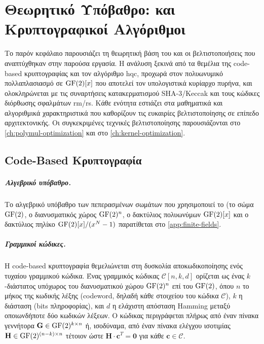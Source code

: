 \chapter{Θεωρητικό Υπόβαθρο: \HQC και Κρυπτογραφικοί Αλγόριθμοι}
\label{ch:theoretical-background}

Το παρόν κεφάλαιο παρουσιάζει τη θεωρητική βάση του \HQC και οι βελτιστοποιήσεις
που αναπτύχθηκαν στην παρούσα εργασία.
Η ανάλυση ξεκινά από τα θεμέλια της code-based κρυπτογραφίας και τον αλγόριθμο \gls{hqc},
προχωρά στον πολυωνυμικό πολλαπλασιασμό σε $\mathrm{GF}(2)[x]$ που αποτελεί τον υπολογιστικά
κυρίαρχο πυρήνα, και ολοκληρώνεται με τις συναρτήσεις κατακερματισμού SHA-3/Keccak
και τους κώδικες διόρθωσης σφαλμάτων \gls{rm}/\gls{rs}.
Κάθε ενότητα εστιάζει στα μαθηματικά και αλγοριθμικά χαρακτηριστικά που καθορίζουν
τις ευκαιρίες βελτιστοποίησης σε επίπεδο αρχιτεκτονικής. Οι συγκεκριμένες τεχνικές
βελτιστοποίησης παρουσιάζονται στο \cref{ch:polymul-optimization} και
στο \cref{ch:kernel-optimization}.


\section{Code-Based Κρυπτογραφία}
\label{sec:code-based-crypto}

\paragraph{Αλγεβρικό υπόβαθρο.}
Το αλγεβρικό υπόβαθρο των πεπερασμένων σωμάτων που χρησιμοποιεί το \HQC (το σώμα $\mathrm{GF}(2)$, ο διανυσματικός χώρος $\mathrm{GF}(2)^n$, ο δακτύλιος πολυωνύμων $\mathrm{GF}(2)[x]$ και ο δακτύλιος πηλίκο $\mathrm{GF}(2)[x]/(x^{N}-1)$ παρατίθεται στο \cref{app:finite-fields}.


\paragraph{Γραμμικοί κώδικες.}
Η code-based κρυπτογραφία θεμελιώνεται στη δυσκολία αποκωδικοποίησης ενός τυχαίου
γραμμικού κώδικα.
Ένας γραμμικός κώδικας $\mathcal{C}[n, k, d]$ ορίζεται ως ένας $k$-διάστατος
υπόχωρος του διανυσματικού χώρου $\mathrm{GF}(2)^n$ επί του $\mathrm{GF}(2)$, όπου $n$ το μήκος της κωδικής λέξης (codeword, δηλαδή κάθε στοιχείου του κώδικα $\mathcal{C}$), $k$ η διάσταση
(bits πληροφορίας), και $d$ η ελάχιστη απόσταση Hamming μεταξύ οποιωνδήποτε δύο
κωδικών λέξεων.
Ο κώδικας περιγράφεται πλήρως από έναν πίνακα γεννήτορα
$\mathbf{G} \in \mathrm{GF}(2)^{k \times n}$ ή, ισοδύναμα, από έναν πίνακα ελέγχου
ισοτιμίας $\mathbf{H} \in \mathrm{GF}(2)^{(n-k) \times n}$ τέτοιον ώστε
$\mathbf{H} \cdot \mathbf{c}^T = \mathbf{0}$ για κάθε $\mathbf{c} \in \mathcal{C}$.

